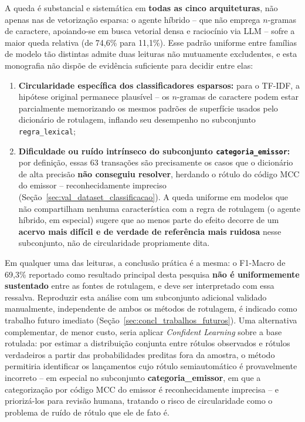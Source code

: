 A queda é substancial e sistemática em \textbf{todas as cinco arquiteturas}, não apenas nas de vetorização esparsa: o agente híbrido -- que não emprega $n$-gramas de caractere, apoiando-se em busca vetorial densa e raciocínio via LLM -- sofre a maior queda relativa (de 74,6\% para 11,1\%). Esse padrão uniforme entre famílias de modelo tão distintas admite duas leituras não mutuamente excludentes, e esta monografia não dispõe de evidência suficiente para decidir entre elas:
\begin{enumerate}
	\item \textbf{Circularidade específica dos classificadores esparsos:} para o TF-IDF, a hipótese original permanece plausível -- os $n$-gramas de caractere podem estar parcialmente memorizando os mesmos padrões de superfície usados pelo dicionário de rotulagem, inflando seu desempenho no subconjunto \texttt{regra\_lexical};
	\item \textbf{Dificuldade ou ruído intrínseco do subconjunto \texttt{categoria\_emissor}:} por definição, essas 63 transações são precisamente os casos que o dicionário de alta precisão \textbf{não conseguiu resolver}, herdando o rótulo do código MCC do emissor -- reconhecidamente impreciso (Seção~\ref{sec:val_dataset_classificacao}). A queda uniforme em modelos que não compartilham nenhuma característica com a regra de rotulagem (o agente híbrido, em especial) sugere que ao menos parte do efeito decorre de um \textbf{acervo mais difícil e de verdade de referência mais ruidosa} nesse subconjunto, não de circularidade propriamente dita.
\end{enumerate}
Em qualquer uma das leituras, a conclusão prática é a mesma: o F1-Macro de 69,3\% reportado como resultado principal desta pesquisa \textbf{não é uniformemente sustentado} entre as fontes de rotulagem, e deve ser interpretado com essa ressalva. Reproduzir esta análise com um subconjunto adicional validado manualmente, independente de ambos os métodos de rotulagem, é indicado como trabalho futuro imediato (Seção~\ref{sec:concl_trabalhos_futuros}). Uma alternativa complementar, de menor custo, seria aplicar \textit{Confident Learning} \cite{northcutt2021aprendizagem} sobre a base rotulada: por estimar a distribuição conjunta entre rótulos observados e rótulos verdadeiros a partir das probabilidades preditas fora da amostra, o método permitiria identificar os lançamentos cujo rótulo semiautomático é provavelmente incorreto -- em especial no subconjunto \textbf{categoria\_emissor}, em que a categorização por código MCC do emissor é reconhecidamente imprecisa -- e priorizá-los para revisão humana, tratando o risco de circularidade como o problema de ruído de rótulo que ele de fato é.

